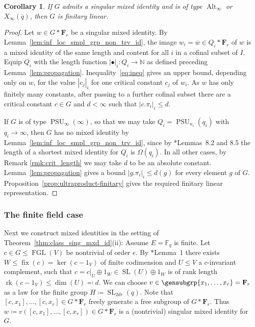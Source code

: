 \documentclass[a4paper,12pt]{amsproc}
\newcommand{\norm}[1]{\left\lvert#1\right\rvert}%
\DeclareMathOperator{\rk}{rk}%
\DeclareMathOperator{\SL}{SL}%
\DeclareMathOperator{\PSU}{PSU}%
\DeclareMathOperator{\Alt}{Alt}%
\newcommand{\rest}[1]{\left.#1\right\rvert}%
\DeclareMathOperator{\fix}{fix}%
\DeclareMathOperator{\FGL}{FGL}%
\theoremstyle{plain}
\newtheorem{corollary}[definition]{Corollary}
\theoremstyle{definition}
\begin{document}
\begin{corollary}\label{cor:unbounded-finitary}
If $G$ admits a singular mixed identity and is of type $\Alt_\infty$ or $X_\infty(\overline{q})$, then $G$ is
finitary linear.
\end{corollary}

\begin{proof}
Let $w\in G\ast\mathbf{F}_r$ be a singular mixed identity. By
Lemma~\ref{lem:inf_loc_smpl_grp_non_trv_id}, the image
$w_i=\overline{w}\in Q_i\ast\mathbf{F}_r$ of $w$ is a mixed identity of the same length and
content for all $i$ in a cofinal subset of $I$. Equip $Q_i$ with the length function $\norm{\bullet}_i\colon Q_i\to\mathbb{N}$ as defined preceding Lemma~\ref{lem:propagation}. Inequality~\eqref{eq:ineq} gives an upper bound, 
depending only on $w$, for the value $\norm{c_j}_i$ for one critical constant $c_j$ of $w_i$.
As $w$ has only finitely many constants,
after passing to a further cofinal subset there are a critical constant
$c\in G$ and $d<\infty$ such that $\norm{c.\pi_i}_i\leq d$. 

If $G$ is of type $\PSU_\infty(\infty)$, 
so that we may take $Q_i = \PSU_{n_i}(q_i)$ with $q_i\to\infty$, 
then $G$ has no mixed identity by Lemma~\ref{lem:inf_loc_smpl_grp_non_trv_id}, 
since by \cite{bradfordschneiderthom2023length}*{Lemmas~8.2 and 8.5} the length of a shortest mixed identity for $Q_i$ is $\Omega (q_i)$. 
In all other cases, by Remark \ref{rmk:crit_length} 
we may take $d$ to be an absolute constant. 
Lemma~\ref{lem:propagation} gives a bound $\norm{g.\pi_i}_i\leq d(g)$ 
for every element $g$ of $G$.
Proposition~\ref{prop:ultraproduct-finitary} gives the required finitary
linear representation.
\end{proof}

\subsubsection{The finite field case}\label{subsubsec:fin_field_case}

Next we construct mixed identities in the setting of Theorem~\ref{thm:class_sing_mxd_id}(ii): Assume $E=\mathbb{F}_q$ is finite. 
Let $c\in G\leq\FGL(V)$ be nontrivial of order $e$. By \cite{bradfordschneiderthom2023non}*{Lemma~1} there exists $W\leq\fix(c)=\ker(c-1_V)$ of finite codimension and $U\leq V$ a $c$-invariant complement, such that $c=\rest{c}_U\oplus 1_W\in\SL(U)\oplus 1_W$ is of rank length $\rk(c-1_V)\leq \dim(U)\eqqcolon d$. We can choose $v\in\gensubgrp{x_1,\ldots,x_r}=\mathbf{F}_r$ as a law for the finite group $H\coloneqq\SL_{2dr}(q)$. 
Note that $[c,x_1] , \ldots , [c,x_r] \in G\ast\mathbf{F}_r$ freely generate a 
free subgroup of $G\ast\mathbf{F}_r$. 
Thus $w\coloneqq v([c,x_1] , \ldots , [c,x_r])\in G\ast\mathbf{F}_r$ is a (nontrivial) singular mixed identity for $G$. 
\end{document}
